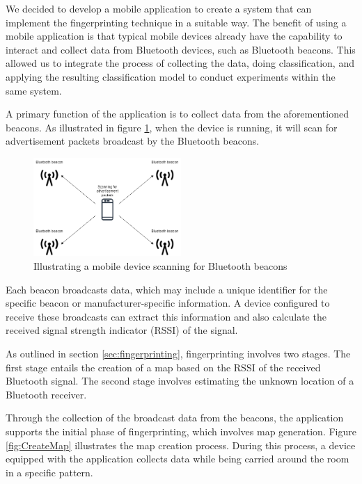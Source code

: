 We decided to develop a mobile application to create a system that can implement the fingerprinting technique in a suitable way.
The benefit of using a mobile application is that typical mobile devices already have the capability to interact and collect data from Bluetooth devices, such as Bluetooth beacons. 
This allowed us to integrate the process of collecting the data, doing classification, and applying the resulting classification model to conduct experiments within the same system.

A primary function of the application is to collect data from the aforementioned beacons. 
As illustrated in figure \ref{fig:ScanAdvertisement}, when the device is running, it will scan for advertisement packets broadcast by the Bluetooth beacons.

\begin{figure}[H]
    \centering
    \includegraphics[width=0.5\textwidth]{images/ScanningForAdvertisement.drawio.png}
    \caption{Illustrating a mobile device scanning for Bluetooth beacons}
    \label{fig:ScanAdvertisement}
\end{figure}

Each beacon broadcasts data, which may include a unique identifier for the specific beacon or manufacturer-specific information.
A device configured to receive these broadcasts can extract this information and also calculate the received signal strength indicator (RSSI) of the signal.

As outlined in section \ref{sec:fingerprinting}, fingerprinting involves two stages.
The first stage entails the creation of a map based on the RSSI of the received Bluetooth signal. The second stage involves estimating the unknown location of a Bluetooth receiver.

Through the collection of the broadcast data from the beacons, the application supports the initial phase of fingerprinting, which involves map generation.
Figure \ref{fig:CreateMap} illustrates the map creation process. During this process, a device equipped with the application collects data while being carried around the room in a specific pattern.

